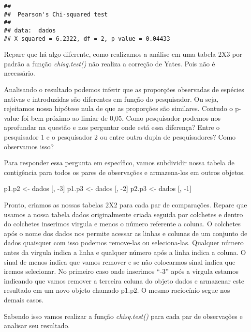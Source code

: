 \documentclass[]{book}
\newenvironment{Shaded}{\begin{snugshade}}{\end{snugshade}}
\newcommand{\DecValTok}[1]{\textcolor[rgb]{0.00,0.00,0.81}{#1}}
\newcommand{\NormalTok}[1]{#1}
\newcommand{\StringTok}[1]{\textcolor[rgb]{0.31,0.60,0.02}{#1}}
\begin{document}
\begin{verbatim}
## 
##  Pearson's Chi-squared test
## 
## data:  dados
## X-squared = 6.2322, df = 2, p-value = 0.04433
\end{verbatim}

Repare que há algo diferente, como realizamos a análise em uma tabela 2X3 por padrão a função \emph{chisq.test()} não realiza a correção de Yates. Pois não é necessário.

Analisando o resultado podemos inferir que as proporções observadas de espécies nativas e introduzidas são diferentes em função do pesquisador. Ou seja, rejeitamos nossa hipótese nula de que as proporções são similares. Contudo o p-value foi bem próximo ao limiar de 0,05. Como pesquisador podemos nos aprofundar na questão e nos perguntar onde está essa diferença? Entre o pesquisador 1 e o pesquisador 2 ou entre outra dupla de pesquisadores? Como observamos isso?

Para responder essa pergunta em específico, vamos subdividir nossa tabela de contigência para todos os pares de observações e armazena-los em outros objetos.

\begin{Shaded}
\begin{Highlighting}[]
\NormalTok{p1.p2 <-}\StringTok{ }\NormalTok{dados [, }\DecValTok{-3}\NormalTok{]}
\NormalTok{p1.p3 <-}\StringTok{ }\NormalTok{dados [, }\DecValTok{-2}\NormalTok{]}
\NormalTok{p2.p3 <-}\StringTok{ }\NormalTok{dados [, }\DecValTok{-1}\NormalTok{]}
\end{Highlighting}
\end{Shaded}

Pronto, criamos as nossas tabelas 2X2 para cada par de comparações. Repare que usamos a nossa tabela dados originalmente criada seguida por colchetes e dentro do colchetes inserimos virgula e menos o número referente a coluna. O colchetes após o nome dos dados nos permite acessar as linhas e colunas de um conjunto de dados quaisquer com isso podemos remove-las ou seleciona-las. Qualquer número antes da virgula indica a linha e qualquer número após a linha indica a coluna. O sinal de menos indica que vamos remover e se não colocarmos sinal indica que iremos selecionar. No primeiro caso onde inserimos ``-3'' após a virgula estamos indicando que vamos remover a terceira coluna do objeto dados e armazenar este resultado em um novo objeto chamado p1.p2. O mesmo raciocínio segue nos demais casos.

Sabendo isso vamos realizar a função \emph{chisq.test()} para cada par de observações e analisar seu resultado.
\end{document}
